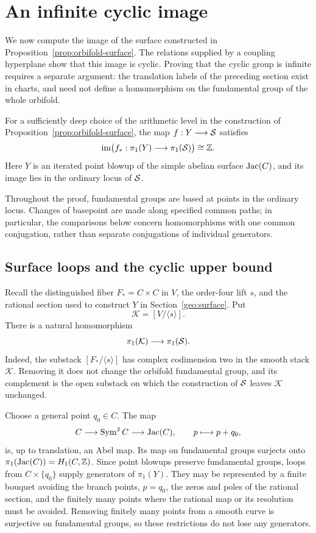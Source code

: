 \section{An infinite cyclic image}\label{sec:image}

We now compute the image of the surface constructed in
Proposition~\ref{prop:orbifold-surface}.  The relations supplied by a
coupling hyperplane show that this image is cyclic.  Proving that the
cyclic group is infinite requires a separate argument: the translation
labels of the preceding section exist in charts, and need not define a
homomorphism on the fundamental group of the whole orbifold.

\begin{theorem}\label{thm:orbifold-cyclic}
For a sufficiently deep choice of the arithmetic level in the
construction of Proposition~\ref{prop:orbifold-surface}, the map
$f:Y\longrightarrow\mathcal S$ satisfies
\[
 \operatorname{im}\bigl(f_*:\pi_1(Y)\longrightarrow\pi_1(\mathcal S)\bigr)\cong\mathbb Z.
\]
Here $Y$ is an iterated point blowup of the simple abelian surface
$\operatorname{Jac}(C)$, and its image lies in the ordinary locus of $\mathcal S$.
\end{theorem}

Throughout the proof, fundamental groups are based at points in the
ordinary locus.  Changes of basepoint are made along specified common
paths; in particular, the comparisons below concern homomorphisms with
one common conjugation, rather than separate conjugations of individual
generators.

\subsection{Surface loops and the cyclic upper bound}

Recall the distinguished fiber $F_*=C\times C$ in $V$, the order-four
lift $s$, and the rational section used to construct $Y$ in
Section~\ref{geo:surface}.  Put
\[
 \mathcal K=[V/\langle s\rangle].
\]
There is a natural homomorphism
\begin{equation}\label{app:comparison-map}
 \pi_1(\mathcal K)\longrightarrow\pi_1(\mathcal S).
\end{equation}
Indeed, the substack $[F_*/\langle s\rangle]$ has complex codimension
two in the smooth stack $\mathcal K$.  Removing it does not change the
orbifold fundamental group, and its complement is the open substack on
which the construction of $\mathcal S$ leaves $\mathcal K$ unchanged.

Choose a general point $q_0\in C$.  The map
\[
 C\longrightarrow\operatorname{Sym}^2 C\longrightarrow\operatorname{Jac}(C),
 \qquad p\longmapsto p+q_0,
\]
is, up to translation, an Abel map.  Its map on fundamental groups
surjects onto $\pi_1(\operatorname{Jac}(C))=H_1(C,\mathbb Z)$.  Since point blowups preserve
fundamental groups, loops from $C\times\{q_0\}$ supply generators of
$\pi_1(Y)$.  They may be represented by a finite bouquet avoiding the
branch points, $p=q_0$, the zeros and poles of the rational section,
and the finitely many points where the rational map or its resolution
must be avoided.  Removing finitely many points from a smooth curve is
surjective on fundamental groups, so these restrictions do not lose any
generators.

